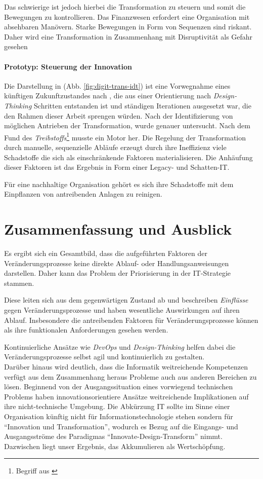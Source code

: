 Das schwierige ist jedoch hierbei die Transformation zu steuern und somit die Bewegungen zu kontrollieren. Das Finanzwesen erfordert eine Organisation mit absehbaren Manövern. Starke Bewegungen in Form von Sequenzen sind riskant. Daher wird eine Transformation in Zusammenhang mit Disruptivität als Gefahr gesehen \cite{eba:2019}

\paragraph{Prototyp: Steuerung der Innovation}
Die Darstellung in (Abb. \ref{fig:digit-trans-idt}) ist eine Vorwegnahme eines künftigen Zukunftzustandes nach \cite{Alt2017}, die aus einer Orientierung nach \emph{Design-Thinking} Schritten entstanden ist und ständigen Iterationen ausgesetzt war, die den Rahmen dieser Arbeit sprengen würden. Nach der Identifizierung von möglichen Antrieben der Transformation, wurde \cite{Ganswindt2006} genauer untersucht. Nach dem Fund des \emph{Treibstoffs}\footnote{Begriff aus \cite{Ganswindt2006}}  musste ein Motor her. Die Regelung der Transformation durch manuelle, sequenzielle Abläufe erzeugt durch ihre Ineffizienz viele Schadstoffe die sich als einschränkende Faktoren materialisieren. Die Anhäufung dieser Faktoren ist das Ergebnis in Form einer Legacy- und Schatten-IT.

Für eine nachhaltige Organisation gehört es sich ihre Schadstoffe mit dem Einpflanzen von antreibenden Anlagen zu reinigen.

\section{Zusammenfassung und Ausblick}
Es ergibt sich ein Gesamtbild, dass die aufgeführten Faktoren der Veränderungsprozesse keine direkte Ablauf- oder Handlungsanweisungen darstellen. Daher kann das Problem der Priorisierung in der IT-Strategie stammen.

Diese leiten sich aus dem gegenwärtigen Zustand ab und beschreiben \emph{Einflüsse} gegen Veränderungsprozesse und haben wesentliche Auswirkungen auf ihren Ablauf. Insbesondere die antreibenden Faktoren für Veränderungsprozesse können als ihre funktionalen Anforderungen gesehen werden.

Kontinuierliche Ansätze wie \emph{DevOps} und \emph{Design-Thinking} helfen dabei die Veränderungsprozesse selbst agil und kontinuierlich zu gestalten. 
\medskip
\\
Darüber hinaus wird deutlich, dass die Informatik weitreichende Kompetenzen verfügt aus dem Zusammenhang heraus Probleme auch aus anderen Bereichen zu lösen. Beginnend von der Ausgangssituation eines vorwiegend technischen Problems haben innovationsorientiere Ansätze weitreichende Implikationen auf ihre nicht-technische Umgebung. Die Abkürzung IT sollte im Sinne einer Organisation künftig nicht für Informationstechnologie stehen sondern für \enquote{Innovation und Transformation}, wodurch es Bezug auf die Eingangs- und Ausgangsströme des Paradigmas \enquote{Innovate-Design-Transform} nimmt. Dazwischen liegt unser Ergebnis, das Akkumulieren als Wertschöpfung.
\medskip

